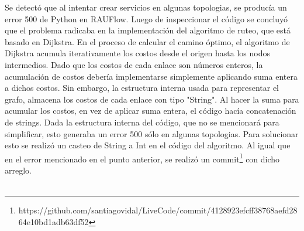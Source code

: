 Se detectó que al intentar crear servicios en algunas topologias, se producía un error 500 de Python en RAUFlow. Luego de inspeccionar el código se concluyó que el problema radicaba en la implementación del algoritmo de ruteo, que está basado en Dijkstra. En el proceso de calcular el camino óptimo, el algoritmo de Dijkstra acumula iterativamente los costos desde el origen hasta los nodos intermedios. Dado que los costos de cada enlace son números enteros, la acumulación de costos debería implementarse simplemente aplicando suma entera a dichos costos. Sin embargo, la estructura interna usada para representar el grafo, almacena los costos de cada enlace con tipo "String". Al hacer la suma para acumular los costos, en vez de aplicar suma entera, el código hacía concatenación de strings. Dada la estructura interna del código, que no se mencionará para simplificar, esto generaba un error 500 sólo en algunas topologias. Para solucionar esto se realizó un casteo de String a Int en el código del algoritmo. Al igual que en el error mencionado en el punto anterior, se realizó un commit\footnote{https://github.com/santiagovidal/LiveCode/commit/4128923efcff38768aefd2864e10bd1adb63df52} con dicho arreglo. \\ \\

